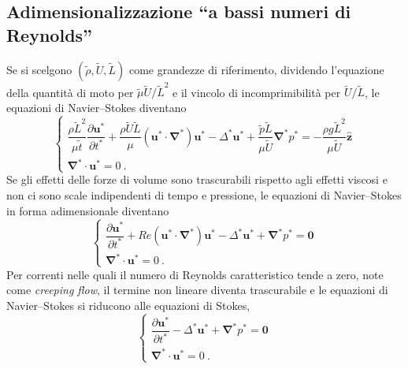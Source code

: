 \subsection{Adimensionalizzazione ``a bassi numeri di Reynolds''}
Se si scelgono $(\tilde{\rho},\tilde{U},\tilde{L})$ come grandezze di riferimento, dividendo l'equazione della quantità di moto per $\tilde{\mu} \tilde{U} / \tilde{L}^2$ e il vincolo di incomprimibilità per $\tilde{U} / \tilde{L}$, le equazioni di Navier--Stokes diventano
\begin{equation}
\begin{cases}
 \dfrac{\rho\tilde{L}^2}{\mu \tilde{t}} \dfrac{\partial \bm{u}^*}{\partial t^*} + \dfrac{\rho \tilde{U} \tilde{L}}{\mu}(\bm{u}^* \cdot \bm{\nabla}^*) \bm{u}^* - \Delta^* \bm{u}^* + \dfrac{\tilde{p}\tilde{L}}{\mu \tilde{U}} \bm{\nabla}^* p^* = -\dfrac{\rho g\tilde{L}^2}{\mu \tilde{U}} \bm{\hat{z}} \\
 \bm{\nabla}^* \cdot \bm{u}^* = 0 \ .
\end{cases}
\end{equation}
Se gli effetti delle forze di volume sono trascurabili rispetto agli effetti viscosi e non ci sono scale indipendenti di tempo e pressione, le equazioni di Navier--Stokes in forma adimensionale diventano
\begin{equation}
\begin{cases}
 \dfrac{\partial \bm{u}^*}{\partial t^*} + Re (\bm{u}^* \cdot \bm{\nabla}^*) \bm{u}^* - \Delta^* \bm{u}^* + \bm{\nabla}^* p^* = \bm{0} \\
 \bm{\nabla}^* \cdot \bm{u}^* = 0 \ .
\end{cases}
\end{equation}
Per correnti nelle quali il numero di Reynolds caratteristico tende a zero, note come \textit{creeping flow}, il termine non lineare diventa trascurabile e le equazioni di Navier--Stokes si riducono alle equazioni di Stokes,
\begin{equation}
\begin{cases}
 \dfrac{\partial \bm{u}^*}{\partial t^*} - \Delta^* \bm{u}^* + \bm{\nabla}^* p^* = \bm{0} \\
 \bm{\nabla}^* \cdot \bm{u}^* = 0 \ .
\end{cases}
\end{equation}

